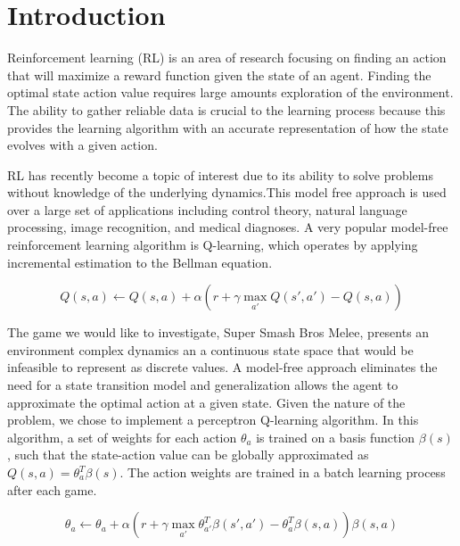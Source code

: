 
\section{Introduction}

Reinforcement learning (RL) is an area of research focusing on finding an action that will maximize a reward function given the state of an agent. Finding the optimal state action value requires large amounts exploration of the environment. The ability to gather reliable data is crucial to the learning process because this provides the learning algorithm with an accurate representation of how the state evolves with a given action. 

RL has recently become a topic of interest due to its ability to solve problems without knowledge of the underlying dynamics.This model free approach is used over a large set of applications including control theory, natural language processing, image recognition, and medical diagnoses. A very popular model-free reinforcement learning algorithm is Q-learning, which operates by applying incremental estimation to the Bellman equation.

\vspace{-6mm}
\begin{equation}
	Q(s,a) \leftarrow Q(s,a)+\alpha(r + \gamma \max_{a'} Q(s',a') - Q(s,a))
\end{equation}
\vspace{-8mm}

The game we would like to investigate, Super Smash Bros Melee, presents an environment complex dynamics an a continuous state space that would be infeasible to represent as discrete values. A model-free approach eliminates the need for a state transition model and generalization allows the agent to approximate the optimal action at a given state. Given the nature of the problem, we chose to implement a perceptron Q-learning algorithm. In this algorithm, a set of weights for each action $\theta_a$ is trained on a basis function $\beta(s)$, such that the state-action value can be globally approximated as $Q(s,a) = \theta^T_a\beta(s)$. The action weights are trained in a batch learning process after each game.

\vspace{-6mm}
\begin{equation}
	\theta_a \leftarrow \theta_a+\alpha(r + \gamma \max_{a'} \theta_{a'}^T\beta(s',a') -  \theta_{a}^T\beta(s,a))\beta(s,a)
\end{equation}
\vspace{-8mm}

